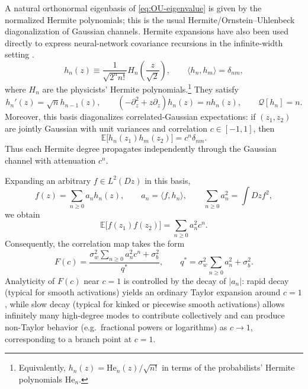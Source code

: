 \documentclass{article}
\theoremstyle{plain}
\theoremstyle{definition}
\theoremstyle{remark}
\begin{document}
A natural orthonormal eigenbasis of \eqref{eq:OU-eigenvalue} is given by the normalized Hermite polynomials; this is the usual Hermite/Ornstein--Uhlenbeck diagonalization of Gaussian channels. Hermite expansions have also been used directly to express neural-network covariance recursions in the infinite-width setting \cite{Arratia2020DeepWideCovariance}.
\relax
\begin{equation}
h_n(z) \equiv \frac{1}{\sqrt{2^n n!}} H_n\left(\frac{z}{\sqrt{2}}\right), \qquad \langle h_n,h_m\rangle = \delta_{nm},
\end{equation}
\relax
where $H_n$ are the physicists' Hermite polynomials.\footnote{Equivalently, $h_n(z)=\mathrm{He}_n(z)/\sqrt{n!}$ in terms of the probabilists' Hermite polynomials $\mathrm{He}_n$.} They satisfy
\relax
\begin{equation}
h_n'(z) = \sqrt{n} h_{n-1}(z), \qquad \left(-\partial_z^2 + z \partial_z\right)h_n(z)=n h_n(z), \qquad \mathcal{Q}[h_n]=n.
\end{equation}
\relax
Moreover, this basis diagonalizes correlated-Gaussian expectations: if $(z_1,z_2)$ are jointly Gaussian with unit variances and correlation $c\in[-1,1]$, then
\relax
\begin{equation}
\mathbb{E}\bigl[h_n(z_1) h_m(z_2)\bigr] = c^n \delta_{nm}.
\label{eq:hermite-diag}
\end{equation}
\relax
Thus each Hermite degree propagates independently through the Gaussian channel with attenuation $c^n$.

Expanding an arbitrary $f \in L^2(Dz)$ in this basis,
\relax
\begin{equation}
f(z)=\sum_{n\ge 0} a_n h_n(z), \qquad a_n=\langle f,h_n\rangle, \qquad \sum_{n\ge 0} a_n^2 = \int Dz f^2,
\end{equation}
\relax
we obtain
\relax
\begin{equation}
\mathbb{E}\bigl[f(z_1)f(z_2)\bigr] = \sum_{n\ge 0} a_n^2 c^n.
\end{equation}
\relax
Consequently, the correlation map takes the form
\relax
\begin{equation}
F(c)=\frac{\sigma_w^2\sum_{n\ge 0} a_n^2 c^n + \sigma_b^2}{q^*}, \qquad q^*=\sigma_w^2\sum_{n\ge 0} a_n^2+\sigma_b^2.
\end{equation}
\relax
Analyticity of $F(c)$ near $c=1$ is controlled by the decay of $|a_n|$: rapid decay (typical for smooth activations) yields an ordinary Taylor expansion around $c=1$, while slow decay (typical for kinked or piecewise smooth activations) allows infinitely many high-degree modes to contribute collectively and can produce non-Taylor behavior (e.g.\ fractional powers or logarithms) as $c\to 1$, corresponding to a branch point at $c=1$.
\end{document}
